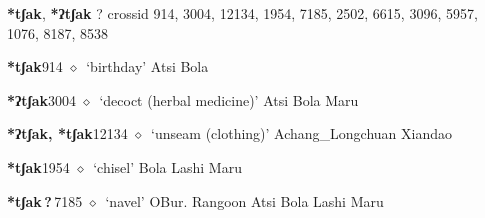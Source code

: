 \item
\textbf{*tʃak}, \textbf{*ʔtʃak}
?
  {\tiny crossid 914, 3004, 12134, 1954, 7185, 2502, 6615, 3096, 5957, 1076, 8187, 8538}
  \begin{list}{}{\leftmargin=1.5em \itemindent=-1.5em}
  \item {\footnotesize \textbf{*tʃak}}{\tiny 914}
         $\diamond$~`birthday'
         Atsi 
\hspace{1ex}
         Bola 
  \item {\footnotesize \textbf{*ʔtʃak}}{\tiny 3004}
\hspace{1ex}
         $\diamond$~`decoct (herbal medicine)'
         Atsi 
\hspace{1ex}
         Bola 
\hspace{1ex}
         Maru 
  \item {\footnotesize \textbf{*ʔtʃak, *tʃak}}{\tiny 12134}
\hspace{1ex}
         $\diamond$~`unseam (clothing)'
         Achang\_Longchuan 
\hspace{1ex}
         Xiandao 
  \item {\footnotesize \textbf{*tʃak}}{\tiny 1954}
\hspace{1ex}
         $\diamond$~`chisel'
         Bola 
\hspace{1ex}
         Lashi 
\hspace{1ex}
         Maru 
  \item {\footnotesize \textbf{*tʃak\,?\,}}{\tiny 7185}
\hspace{1ex}
         $\diamond$~`navel'
         OBur. 
\hspace{1ex}
         Rangoon 
\hspace{1ex}
         Atsi 
\hspace{1ex}
         Bola 
\hspace{1ex}
         Lashi 
\hspace{1ex}
         Maru 
\hspace{1ex}

\end{list}
